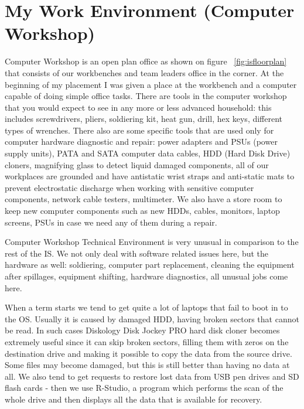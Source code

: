 \documentclass[10pt,a4paper,headinclude=true,twoside]{report}
\begin{document}
\section{My Work Environment (Computer Workshop)}
Computer Workshop is an open plan office as shown on figure ~\ref{fig:isfloorplan} that consists of our workbenches and team leaders office in the corner. At the beginning of my placement I was given a place at the workbench and a computer capable of doing simple office tasks. There are tools in the computer workshop that you would expect to see in any more or less advanced household: this includes screwdrivers, pliers, soldiering kit, heat gun, drill, hex keys, different types of wrenches. There also are some specific tools that are used only for computer hardware diagnostic and repair: power adapters and PSUs (power supply units), PATA and SATA computer data cables, HDD (Hard Disk Drive) cloners, magnifying glass to detect liquid damaged components, all of our workplaces are grounded and have antistatic wrist straps and anti-static mats to prevent electrostatic discharge when working with sensitive computer components, network cable testers, multimeter. We also have a store room to keep new computer components such as new HDDs, cables, monitors, laptop screens, PSUs in case we need any of them during a repair.    

Computer Workshop Technical Environment is very unusual in comparison to the rest of the IS. We not only deal with software related issues here, but the hardware as well: soldiering, computer part replacement, cleaning the equipment after spillages, equipment shifting, hardware diagnostics, all unusual jobs come here.

When a term starts we tend to get quite a lot of laptops that fail to boot in to the OS. Usually it is caused by damaged HDD, having broken sectors that cannot be read. In such cases Diskology Disk Jockey PRO hard disk cloner\cite{DiskCloner} becomes extremely useful since it can skip broken sectors, filling them with zeros on the destination drive and making it possible to copy the data from the source drive. Some files may become damaged, but this is still better than having no data at all. We also tend to get requests to restore lost data from USB pen drives and SD flash cards - then we use R-Studio, a program which performs the scan of the whole drive and then displays all the data that is available for recovery. 
\end{document}
